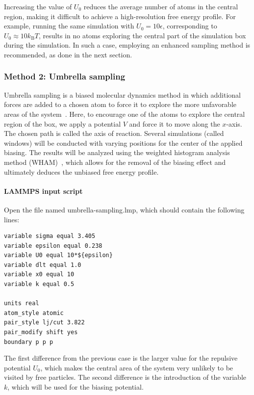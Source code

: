\documentclass[9pt,tutorial]{livecoms}
\newcommand{\lmpcmd}[1]{\hspace{0pt}\colorbox{listing}{\textcolor{command}{\small{#1}}}\hspace{0pt}} %
\begin{document}
Increasing the value of $U_0$ reduces the average number of atoms in the central
region, making it difficult to achieve a high-resolution free energy profile.
For example, running the same simulation with $U_0 = 10 \epsilon$,
corresponding to $U_0 \approx 10 k_\text{B} T$, results in no atoms exploring
the central part of the simulation box during the simulation.
In such a case, employing an enhanced sampling method is recommended, as done in the next section.

\subsubsection{Method 2: Umbrella sampling}

Umbrella sampling is a biased molecular dynamics method in which additional forces
are added to a chosen atom to force it to explore the more unfavorable areas of
the system~\cite{kastner2011umbrella, allen2017computer, frenkel2023understanding}.
Here, to encourage one of the atoms to explore the central region of the box,
we apply a potential $V$ and force it to move along the $x$-axis. The chosen path
is called the axis of reaction. Several simulations (called windows) will be
conducted with varying positions for the center of the applied biasing. The results
will be analyzed using the weighted histogram analysis method (WHAM)~\cite{kumar1992weighted},
which allows for the removal of the biasing effect and ultimately deduces the
unbiased free energy profile.

\paragraph{LAMMPS input script}

Open the file named \lmpcmd{umbrella-sampling.lmp}, which should
contain the following lines:
\begin{lstlisting}
variable sigma equal 3.405
variable epsilon equal 0.238
variable U0 equal 10*${epsilon}
variable dlt equal 1.0
variable x0 equal 10
variable k equal 0.5

units real
atom_style atomic
pair_style lj/cut 3.822
pair_modify shift yes
boundary p p p
\end{lstlisting}
The first difference from the previous case is the larger value
for the repulsive potential $U_0$, which makes the central area
of the system very unlikely to be visited by free particles.  The second
difference is the introduction of the variable $k$, which will be used for
the biasing potential.
\end{document}
